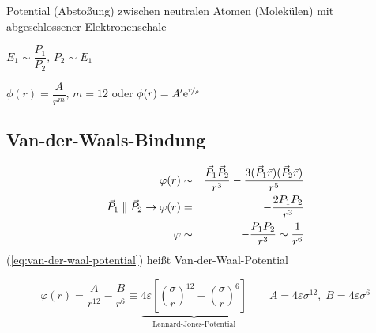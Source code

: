 Potential (Abstoßung) zwischen neutralen Atomen (Molekülen) mit abgeschlossener Elektronenschale

$E_1 \sim \dfrac{P_1}{P_2},\, P_2 \sim E_1$

$\phi (r)=\dfrac{A}{r^m},\, m=12$ oder $\phi(r)=A^\prime \text{e}^{\nicefrac{r}{\rho}}$

\subsection{Van-der-Waals-Bindung}



\begin{eqnarray}
\varphi(r) & \sim & \dfrac{\vec{P}_1\vec{P}_2}{r^3}-\dfrac{3(\vec{P}_1\vec{r})(\vec{P}_2\vec{r})}{r^5} \notag \\
\vec{P}_1 \parallel \vec{P}_2 \to \varphi(r) & = & -\dfrac{2P_1 P_2}{r^3} \notag \\
\varphi & \sim & -\dfrac{P_1 P_2}{r^3} \sim \dfrac{1}{r^6}\label{eq:van-der-waal-potential}
\end{eqnarray}
(\ref{eq:van-der-waal-potential}) heißt Van-der-Waal-Potential

$$\varphi(r)=\dfrac{A}{r^{12}}-\dfrac{B}{r^6}\equiv \underbrace{4\varepsilon\left[\left(\dfrac{\sigma}{r}\right)^{12}-\left(\dfrac{\sigma}{r}\right)^6\right]}_{\text{Lennard-Jones-Potential}} \qquad A=4\varepsilon \sigma^{12},\;B=4\varepsilon \sigma^6$$